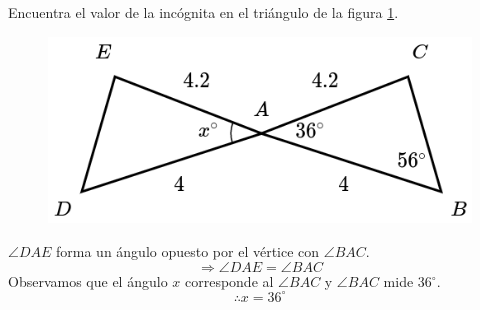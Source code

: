 Encuentra el valor de la incógnita en el triángulo de la figura \ref{fig:angle_triangle_34}.

\begin{minipage}[t][4cm][b]{0.3\textwidth}
    \begin{figure}[H]
        \centering
        \includegraphics[width=0.99\linewidth]{../images/angle_triangle_34.png}
        \caption{}
        \label{fig:angle_triangle_34}
    \end{figure}
\end{minipage}\hfill
\begin{minipage}[t]{0.65\textwidth}
    \begin{solutionbox}{4cm}
        $\angle DAE$ forma un ángulo opuesto por el vértice con $\angle BAC$.\\
        \[\Rightarrow \angle DAE = \angle BAC \]
        Observamos que el ángulo $x$ corresponde al
        $\angle BAC$ y $\angle BAC$ mide
        36$^\circ$.
        \[\therefore x=36^\circ\]
    \end{solutionbox}
\end{minipage}
